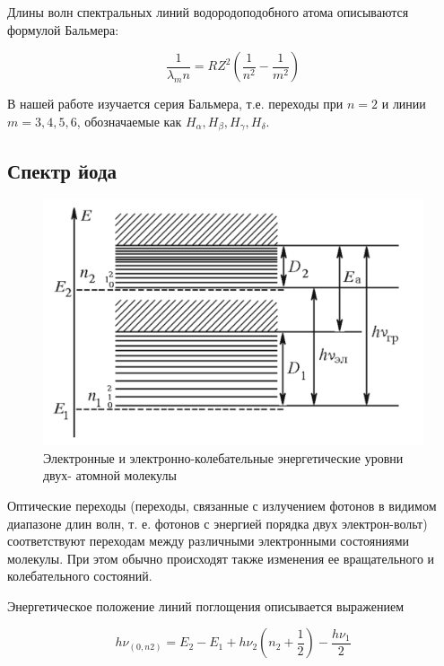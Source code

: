 \documentclass[12pt]{kiarticle} %
\begin{document}
	Длины волн спектральных линий водородоподобного атома описываются формулой Бальмера:
	
	\begin{equation}\label{Balmer}
	\dfrac{1}{\lambda_mn} = R Z^2 \left( \dfrac{1}{n^2} - \dfrac{1}{m^2} \right) 
	\end{equation}
	
	В нашей работе изучается серия Бальмера, т.е. переходы при $ n = 2 $ и линии $ m = 3, 4, 5, 6 $, обозначаемые как $ H_\alpha, H_\beta, H_\gamma, H_\delta $.
	
	\subsection{Спектр йода}
	
	\begin{figure}
		\includegraphics[width=\linewidth]{iod}
		\caption{Электронные и электронно-колебательные энергетические уровни двух-
			атомной молекулы}
		\label{ris I(V)}
	\end{figure}
	
	Оптические переходы (переходы, связанные с излучением фотонов в видимом диапазоне длин волн, т. е. фотонов с энергией порядка двух электрон-вольт) соответствуют переходам между различными электронными состояниями молекулы. При этом обычно происходят также изменения ее вращательного и колебательного состояний. 
	
	Энергетическое положение линий поглощения описывается выражением
	
	\begin{equation}\label{iod}
	h\nu_{(0,n2)} = E_2 - E_1 + h\nu_2 \left( n_2 + \dfrac{1}{2} \right) - \dfrac{h \nu_1}{2}
	\end{equation}
	
\end{document}
